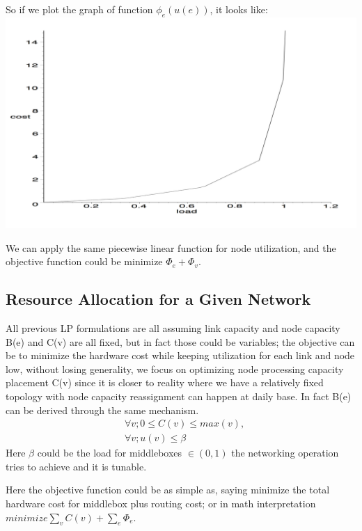 \documentclass[twoside,leqno, 11pt]{article}
\begin{document}
So if we plot the graph of function $\phi_e(u (e) )$, it looks like:
\newline
\includegraphics[scale=0.90]{piecewise.png} 
 
 We can apply the same piecewise linear function for node utilization, and the objective function could be minimize 
 $\Phi_e + \Phi_v$.

\subsection{Resource Allocation for a Given Network} All previous LP formulations are all assuming link capacity and node capacity B(e) and C(v) are all fixed, but in fact those could be variables; the objective can be to minimize the hardware cost while keeping utilization for each link and node low, without losing generality, we focus on optimizing node processing capacity placement C(v) since it is closer to reality where we have a relatively fixed topology with node capacity reassignment can happen at daily base. In fact B(e) can be derived through the same mechanism. 
\begin{subequations}
\begin{align*}
&\forall v; 0 \leq C(v) \leq max(v) ,\\
&\forall v; u(v) \leq \beta
\end{align*}
\end{subequations}
Here $\beta$ could be the load for middleboxes $\in (0,1)$ the networking operation tries to achieve and it is tunable.

Here the objective function could be as simple as, saying minimize the total hardware cost for middlebox plus routing cost; or in math interpretation  $minimize \sum\limits_v C(v)+ \sum\limits_e \Phi_e$.  
\end{document}
